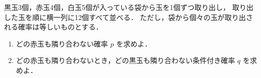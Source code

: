 ﻿\documentclass[../../../uem_mat_tok_q.tex]{subfiles}
\begin{document}
    黒玉3個，赤玉4個，白玉5個が入っている袋から玉を1個ずつ取り出し，%
    取り出した玉を順に横一列に12個すべて並べる．%
    ただし，袋から個々の玉が取り出される確率は等しいものとする．

    \begin{enumerate}
        \item どの赤玉も隣り合わない確率 $p$ を求めよ．
        \item どの赤玉も隣り合わないとき，どの黒玉も隣り合わない条件付き確率 $q$ を求めよ．
    \end{enumerate}
\end{document}
